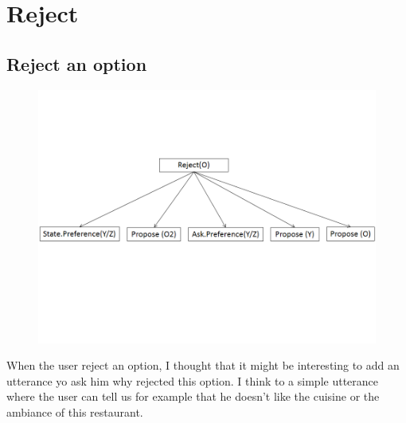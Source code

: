 \documentclass{llncs}
\begin{document}
\section{Reject}

\subsection{Reject an option}

\begin{figure}
\centerline{\includegraphics[width=5in]{figs/rejectO.PNG}}
\vskip 8pt
\end{figure}

\par When the user reject an option, I thought that it might be interesting to add an utterance yo ask him why rejected this option. I think to a simple utterance where the user can tell us for example that he doesn't like the cuisine or the ambiance of this restaurant. 
\end{document}
